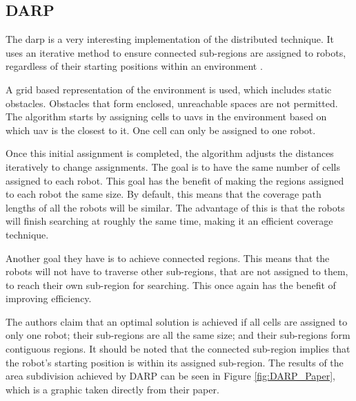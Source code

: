 \subsection{DARP}
\label{sec:LR DARP}
The \ac{darp} is a very interesting implementation of the distributed technique. It uses an iterative method to ensure connected sub-regions are assigned to robots, regardless of their starting positions within an environment \cite{DARP2017}.

A grid based representation of the environment is used, which includes static obstacles. Obstacles that form enclosed, unreachable spaces are not permitted. The algorithm starts by assigning cells to \acp{uav} in the environment based on which \ac{uav} is the closest to it. One cell can only be assigned to one robot.

Once this initial assignment is completed, the algorithm adjusts the distances iteratively to change assignments. The goal is to have the same number of cells assigned to each robot. This goal has the benefit of making the regions assigned to each robot the same size. By default, this means that the coverage path lengths of all the robots will be similar. The advantage of this is that the robots will finish searching at roughly the same time, making it an efficient coverage technique.

Another goal they have is to achieve connected regions. This means that the robots will not have to traverse other sub-regions, that are not assigned to them, to reach their own sub-region for searching. This once again has the benefit of improving efficiency.

The authors claim that an optimal solution is achieved if all cells are assigned to only one robot; their sub-regions are all the same size; and their sub-regions form contiguous regions. It should be noted that the connected sub-region implies that the robot's starting position is within its assigned sub-region. The results of the area subdivision achieved by DARP can be seen in Figure \ref{fig:DARP_Paper}, which is a graphic taken directly from their paper.

